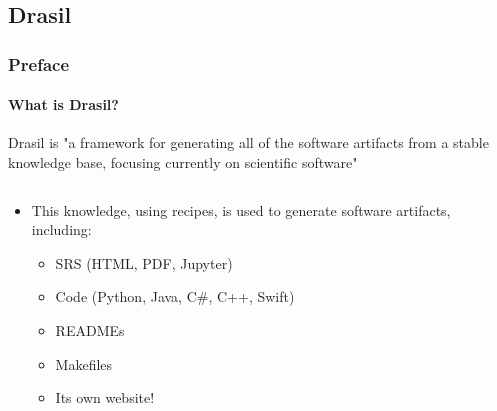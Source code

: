 \documentclass{beamer}
\begin{document}
\subsection{Drasil}

\begin{frame}
    \frametitle{Preface}
    \framesubtitle{What is Drasil?}
    Drasil is "a framework for generating all of the software
    artifacts from a stable knowledge base, focusing
    currently on scientific software" \cite{HuntEtAl2021}
    \vspace{-2mm}
    \begin{columns}[T,onlytextwidth]
        \begin{column}{.5\textwidth}
            \vspace{2mm}
            \begin{minipage}{\textwidth}
                \begin{itemize}
                    \item<2-> This knowledge, using recipes, is used to generate
                          software artifacts, including:
                          \begin{itemize}
                              \item SRS (HTML, PDF, Jupyter)
                              \item Code (Python, Java, C\#, C++, Swift)
                              \item READMEs
                              \item Makefiles
                              \item Its own website\footnotemark[1]!
                          \end{itemize}
                \end{itemize}
            \end{minipage}
        \end{column}
        \begin{column}{.45\textwidth}
            \vspace{-4mm}
        \end{column}
    \end{columns}
\end{frame}
\end{document}
